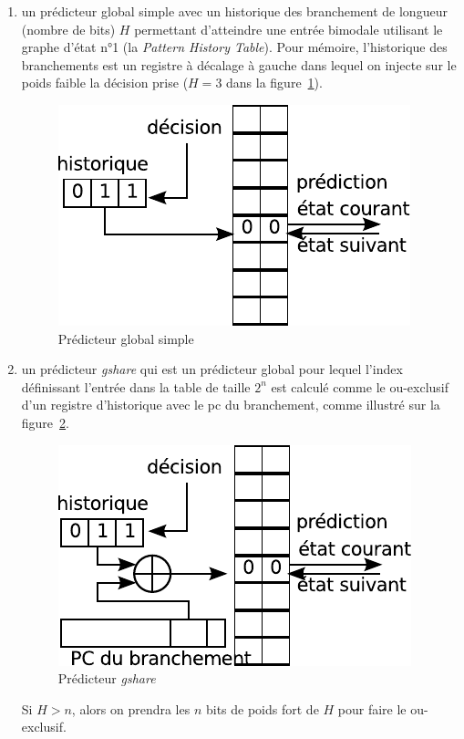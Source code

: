 \documentclass[a4paper]{article}
\begin{document}
\begin{enumerate}
\item un prédicteur global simple avec un historique des branchement de longueur (nombre de bits) $H$ permettant d'atteindre une entrée bimodale utilisant le graphe d'état n°1 (la \emph{Pattern History Table}).
      Pour mémoire, l'historique des branchements est un registre à décalage à gauche dans lequel on injecte sur le poids faible la décision prise ($H=3$ dans la figure~\ref{global-simple}).
      \begin{figure}[hbt]\center\leavevmode
      \includegraphics[scale=.9]{global-simple}
      \caption{Prédicteur global simple}
      \label{global-simple}
      \end{figure}

\item un prédicteur \emph{gshare} qui est un prédicteur global pour lequel l'index définissant l'entrée dans la table de taille $2^n$ est calculé comme le ou-exclusif d'un registre d'historique avec le pc du branchement, comme illustré sur la figure~\ref{gshare}.
      \begin{figure}[hbt]\center\leavevmode
      \includegraphics[scale=.9]{gshare}
      \caption{Prédicteur \emph{gshare}}
      \label{gshare}
      \end{figure}
      Si $H>n$, alors on prendra les $n$ bits de poids fort de $H$ pour faire le ou-exclusif.


\end{enumerate}
\end{document}
